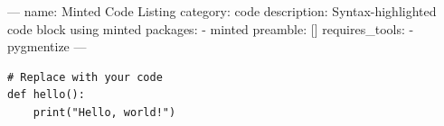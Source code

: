 ---
name: Minted Code Listing
category: code
description: Syntax-highlighted code block using minted
packages:
  - minted
preamble: []
requires_tools:
  - pygmentize
---
\begin{verbatim}
# Replace with your code
def hello():
    print("Hello, world!")
\end{verbatim}
